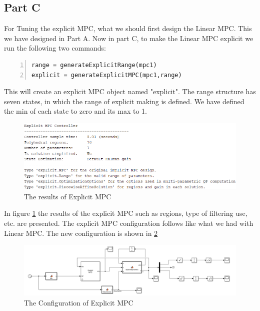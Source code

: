 \documentclass{article}
\begin{document}
\FloatBarrier
\subsection{Part C}
For Tuning the explicit MPC, what we should first design the Linear MPC. This we have designed in Part A. Now in part C, to make the Linear MPC explicit we run the following two commands:

\begin{lstlisting}[frame=single,numbers=left,style=Matlab-Pyglike]
range = generateExplicitRange(mpc1)
explicit = generateExplicitMPC(mpc1,range)
\end{lstlisting}

This will create an explicit MPC object named "explicit". The range structure has seven states, in which the range of explicit making is defined. We have defined the min of each state to zero and its max to 1.

\begin{figure}[htbp]
    \centering
    \includegraphics[width=\linewidth]{images/ExplicitMPC.png}
    \caption{The results of Explicit MPC}
    \label{fig:Exp}
\end{figure}

In figure \ref{fig:Exp} the results of the explicit MPC such as regions, type of filtering use, etc. are presented. The explicit MPC configuration follows like what we had with Linear MPC. The new configuration is shown in \ref{fig:ExplicitMPC}

\begin{figure}[htbp]
    \centering
    \includegraphics[width=\linewidth]{images/ExplicitConfig.png}
    \caption{The Configuration of Explicit MPC}
    \label{fig:ExplicitMPC}
\end{figure}
\end{document}
